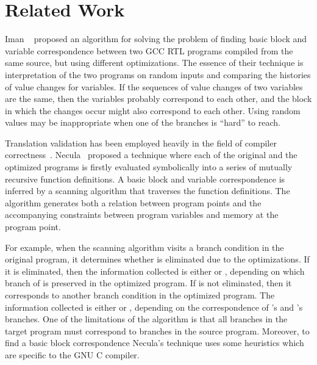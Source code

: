 \section{Related Work}\label{sec:RW}

Iman \etal~\cite{Iman2005} proposed an algorithm for solving the problem of
finding basic block and variable correspondence between two GCC RTL programs
compiled from the same source, but using different optimizations.  The essence
of their technique is interpretation of the two programs on random inputs and
comparing the histories of value changes for variables.  If the sequences of
value changes of two variables are the same, then the variables probably
correspond to each other, and the block in which the changes occur might also
correspond to each other. Using random values may be inappropriate when one of
the branches is “hard” to reach.

Translation validation  has been employed heavily in the field of compiler
correctness~\cite{VOC2002,TVOC:CAV2005,Necula:2000}.  Necula~\cite{Necula:2000}
proposed a technique where each of the original and the optimized programs is
firstly evaluated symbolically into a series of mutually recursive function
definitions. A basic block and variable correspondence is inferred by a
scanning algorithm that traverses the function definitions. The algorithm
generates both a relation between program points and the accompanying
constraints between program variables and memory at the program point.  

For example, when the scanning algorithm visits a branch condition  in the
original program, it determines whether  is eliminated due to the
optimizations. If it is eliminated, then the information collected is either
 or , depending on which branch of  is preserved
in the optimized program. 
%
If  is not eliminated, then it corresponds to another branch condition
 in the optimized program. The information collected is either 
or , depending on the correspondence of ’s and ’s
branches. One of the limitations of the algorithm is that all branches in the
target program must correspond to branches in the source program.  Moreover, to
find a basic block correspondence Necula’s technique uses some heuristics which
are specific to the GNU C compiler. 


